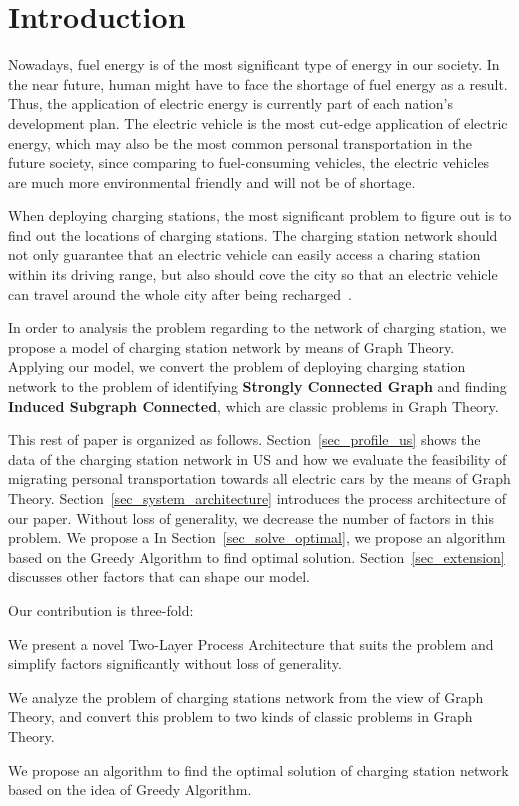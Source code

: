 \section{Introduction}
\label{sec_introduction}
Nowadays, fuel energy is of the most significant type of energy in our society.
In the near future, human might have to face the shortage of fuel energy as a result.
Thus, the application of electric energy is currently part of each nation's development plan.
The electric vehicle is the most cut-edge application of electric energy, which may also be the most common personal transportation in the future society,
since comparing to fuel-consuming vehicles, the electric vehicles are much more environmental friendly and will not be of shortage.

When deploying charging stations, the most significant problem to figure out is to find out the locations of charging stations.
The charging station network should not only guarantee that an electric vehicle can easily access a charing station within its driving range,
but also should cove the city so that an electric vehicle can travel around the whole city after being recharged~\cite{lam2013electric}.

In order to analysis the problem regarding to the network of charging station,
we propose a model of charging station network by means of Graph Theory.
Applying our model, we convert the problem of deploying charging station network to the problem of identifying \textbf{Strongly Connected Graph} and finding \textbf{Induced Subgraph Connected},
which are classic problems in Graph Theory.

This rest of paper is organized as follows.
Section~\ref{sec_profile_us} shows the data of the charging station network in US and how we evaluate the feasibility of migrating personal transportation towards all electric cars by the means of Graph Theory.
Section~\ref{sec_system_architecture} introduces the process architecture of our paper.
Without loss of generality, we decrease the number of factors in this problem. We propose a
In Section~\ref{sec_solve_optimal}, we propose an algorithm based on the Greedy Algorithm to find optimal solution.
Section~\ref{sec_extension} discusses other factors that can shape our model.

Our contribution is three-fold:
\begin{contribution}
We present a novel Two-Layer Process Architecture that suits the problem and simplify factors significantly without loss of generality.
\end{contribution}
\begin{contribution}
We analyze the problem of charging stations network from the view of Graph Theory, and
convert this problem to two kinds of classic problems in Graph Theory.
\end{contribution}
\begin{contribution}
We propose an algorithm to find the optimal solution of charging station network based on the idea of Greedy Algorithm.
\end{contribution}

